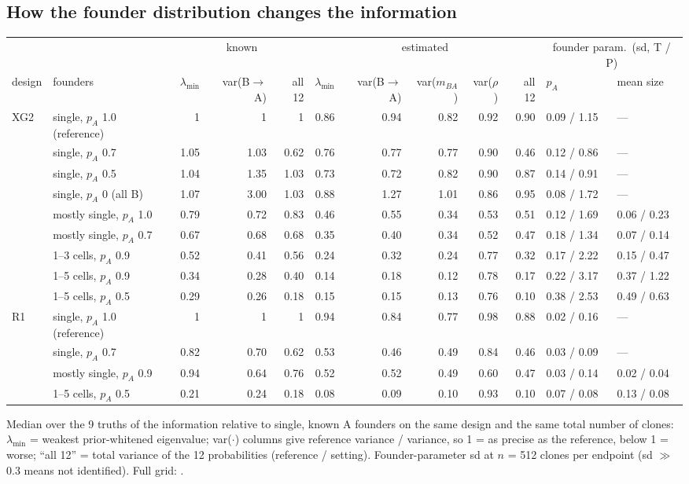 \documentclass[10pt,a4paper]{article}
\newcommand{\BA}{B$\to$A}
\begin{document}
\subsection{How the founder distribution changes the information}
\begin{center}\scriptsize\setlength{\tabcolsep}{2pt}
\begin{tabular}{@{}llrrrrrrrrll@{}}\toprule
 & & \multicolumn{3}{c}{known} & \multicolumn{5}{c}{estimated} & \multicolumn{2}{c}{founder param.\ (sd, T / P)} \\
design & founders & $\lambda_{\min}$ & var(\BA) & all 12 & $\lambda_{\min}$ & var(\BA) & var($m_{BA}$) & var($\rho$) & all 12 & $p_A$ & mean size \\\midrule
XG2 & single, $p_A$ 1.0 (reference) & 1 & 1 & 1 & 0.86 & 0.94 & 0.82 & 0.92 & 0.90 & 0.09 / 1.15 & --- \\
 & single, $p_A$ 0.7 & 1.05 & 1.03 & 0.62 & 0.76 & 0.77 & 0.77 & 0.90 & 0.46 & 0.12 / 0.86 & --- \\
 & single, $p_A$ 0.5 & 1.04 & 1.35 & 1.03 & 0.73 & 0.72 & 0.82 & 0.90 & 0.87 & 0.14 / 0.91 & --- \\
 & single, $p_A$ 0 (all B) & 1.07 & 3.00 & 1.03 & 0.88 & 1.27 & 1.01 & 0.86 & 0.95 & 0.08 / 1.72 & --- \\
 & mostly single, $p_A$ 1.0 & 0.79 & 0.72 & 0.83 & 0.46 & 0.55 & 0.34 & 0.53 & 0.51 & 0.12 / 1.69 & 0.06 / 0.23 \\
 & mostly single, $p_A$ 0.7 & 0.67 & 0.68 & 0.68 & 0.35 & 0.40 & 0.34 & 0.52 & 0.47 & 0.18 / 1.34 & 0.07 / 0.14 \\
 & 1--3 cells, $p_A$ 0.9 & 0.52 & 0.41 & 0.56 & 0.24 & 0.32 & 0.24 & 0.77 & 0.32 & 0.17 / 2.22 & 0.15 / 0.47 \\
 & 1--5 cells, $p_A$ 0.9 & 0.34 & 0.28 & 0.40 & 0.14 & 0.18 & 0.12 & 0.78 & 0.17 & 0.22 / 3.17 & 0.37 / 1.22 \\
 & 1--5 cells, $p_A$ 0.5 & 0.29 & 0.26 & 0.18 & 0.15 & 0.15 & 0.13 & 0.76 & 0.10 & 0.38 / 2.53 & 0.49 / 0.63 \\\midrule
R1 & single, $p_A$ 1.0 (reference) & 1 & 1 & 1 & 0.94 & 0.84 & 0.77 & 0.98 & 0.88 & 0.02 / 0.16 & --- \\
 & single, $p_A$ 0.7 & 0.82 & 0.70 & 0.62 & 0.53 & 0.46 & 0.49 & 0.84 & 0.46 & 0.03 / 0.09 & --- \\
 & mostly single, $p_A$ 0.9 & 0.94 & 0.64 & 0.76 & 0.52 & 0.52 & 0.49 & 0.60 & 0.47 & 0.03 / 0.14 & 0.02 / 0.04 \\
 & 1--5 cells, $p_A$ 0.5 & 0.21 & 0.24 & 0.18 & 0.08 & 0.09 & 0.10 & 0.93 & 0.10 & 0.07 / 0.08 & 0.13 / 0.08 \\\bottomrule
\end{tabular}

Median over the 9 truths of the information relative to single, known A founders on the same design and the same total number of clones: $\lambda_{\min}$ = weakest prior-whitened eigenvalue; var($\cdot$) columns give reference variance / variance, so 1 = as precise as the reference, below 1 = worse; ``all 12'' = total variance of the 12 probabilities (reference / setting). Founder-parameter sd at $n$ = 512 clones per endpoint (sd $\gg$ 0.3 means not identified). Full grid: .
\end{center}
\end{document}
